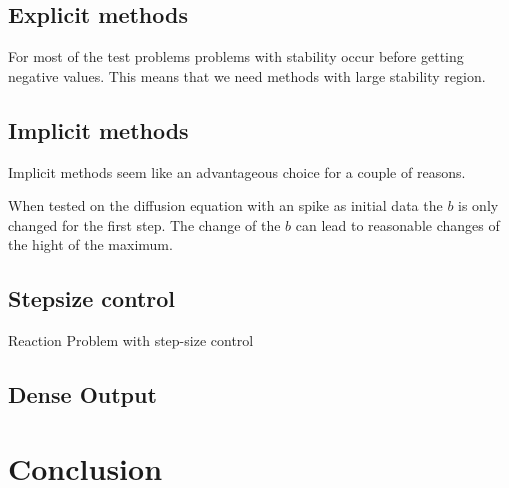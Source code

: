 \documentclass[a4paper]{scrartcl}
\numberwithin{equation}{section}
\theoremstyle{plain}
\theoremstyle{definition}
\numberwithin{theorem}{section}
\newcommand{\1}{\mathbbm{1}}
\begin{document}
\subsection{Explicit methods}
For most of the test problems problems with stability occur before getting negative values. This means that we need methods with large stability region.



\subsection{Implicit methods}
Implicit methods seem like an advantageous choice for a couple of reasons.

When tested on the diffusion equation with an spike as initial data the $b$ is only changed for the first step. The change of the $b$ can lead to reasonable changes of the hight of the maximum. 

\subsection{Stepsize control}

Reaction Problem with step-size control

\subsection{Dense Output}


\section{Conclusion} \label{sec:conclusion}




\printbibliography
\end{document}

